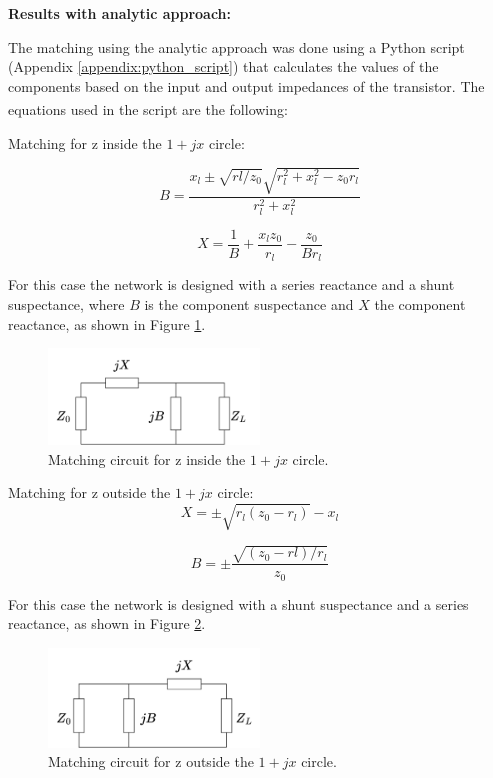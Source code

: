 \vspace{0.4cm}
\textbf{Results with analytic approach:}
\vspace{0.4cm}

The matching using the analytic approach was done using a Python script (Appendix \ref{appendix:python_script}) that calculates the values of the components based on the input and output impedances of the transistor. The equations used in the script are the following\textsuperscript{\cite{Pozar}}:

Matching for z inside the $1+jx$ circle:

\begin{equation}
    B = \frac{x_l \pm \sqrt{rl/z_0}\sqrt{r_l^2 + x_l^2- z_0 r_l}}{r_l^2+ x_l^2}
    \label{eq:Binside}
\end{equation}

\begin{equation}
    X = \frac{1}{B}+\frac{x_l z_0}{r_l}-\frac{z_0}{Br_l}
    \label{eq:Xinside}
\end{equation}

For this case the network is designed with a series reactance and a shunt suspectance, where $B$ is the component suspectance and $X$ the component reactance, as shown in Figure \ref{fig:inside-matching}.
\begin{figure}[H]
    \centering
    \includegraphics[width=0.5\textwidth]{Images/outside-matching.png}
    \caption{Matching circuit for z inside the $1+jx$ circle.}
    \label{fig:inside-matching}
\end{figure}

Matching for z outside the $1+jx$ circle:
\begin{equation}
    X = \pm \sqrt{r_l(z_0-r_l)}-x_l
    \label{eq:Xoutside}
\end{equation}

\begin{equation}
    B = \pm \frac{\sqrt{(z_0-rl)/r_l}}{z_0}
    \label{eq:Boutside}
\end{equation}

For this case the network is designed with a shunt suspectance and a series reactance, as shown in Figure \ref{fig:outside-matching}.
\begin{figure}[H]
    \centering
    \includegraphics[width=0.5\textwidth]{Images/inside-matching.png}
    \caption{Matching circuit for z outside the $1+jx$ circle.}
    \label{fig:outside-matching}
\end{figure}

